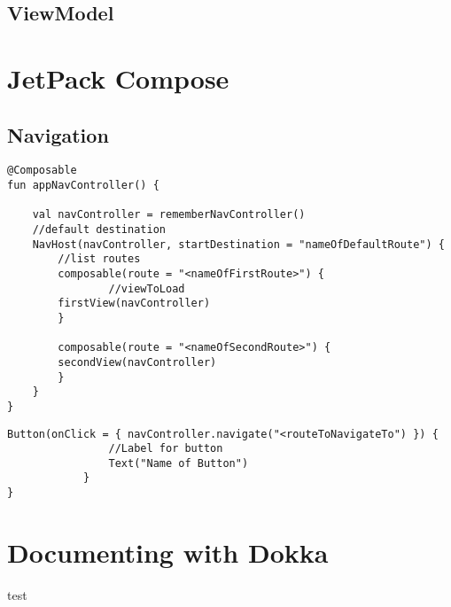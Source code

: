 \documentclass[12pt]{article}
\begin{document}
\subsection{ViewModel}


\section{JetPack Compose}

\subsection{Navigation}



\begin{lstlisting}[numbers=none, 
			caption=Function to create a simple Nav Controller,
			label={lst:navControllerFunction}]
@Composable
fun appNavController() {

    val navController = rememberNavController()
    //default destination
    NavHost(navController, startDestination = "nameOfDefaultRoute") {
    	//list routes
        composable(route = "<nameOfFirstRoute>") {
        	    //viewToLoad
	    firstView(navController)
        }
        
        composable(route = "<nameOfSecondRoute>") {
	    secondView(navController)
        }
    }
}
\end{lstlisting}


\begin{lstlisting}[numbers=none, 
			caption=Button to navigate to a view,
			label={lst:navButton}]
Button(onClick = { navController.navigate("<routeToNavigateTo") }) {
                //Label for button
                Text("Name of Button")
            }
}
\end{lstlisting}

\section{Documenting with Dokka}
test
\begin{appendix}
  \listoffigures
  \listoftables
  \lstlistoflistings

\end{appendix}
  
\end{document}
